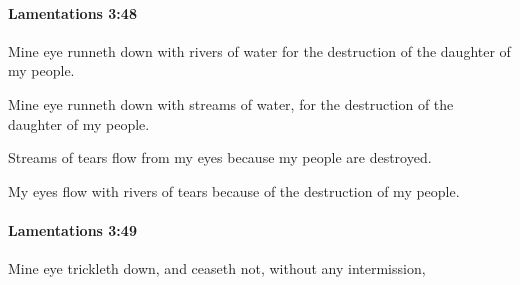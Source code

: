 		\paragraph{Lamentations 3:48} %
			\label{LAMENTATIONS-3-48}

			Mine eye runneth down with rivers of water for the destruction of the daughter of my people.

			\begin{versebox}
					\item[BHS] 
					\item[LXX] 
					\item[ASV] Mine eye runneth down with streams of water, for the destruction of the daughter of my people.
					\item[NIV] Streams of tears flow from my eyes because my people are destroyed.
					\item[NRSV] My eyes flow with rivers of tears because of the destruction of my people.
			\end{versebox}

		\paragraph{Lamentations 3:49} %
			\label{LAMENTATIONS-3-49}

			Mine eye trickleth down, and ceaseth not, without any intermission,

